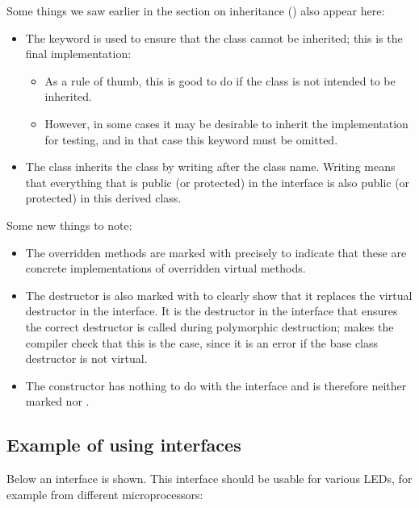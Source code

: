 \noindent Some things we saw earlier in the section on inheritance ()
also appear here:
\begin{itemize}
  \item The keyword  is used to ensure that the class 
    cannot be inherited; this is the final implementation:
  \begin{itemize}
    \item As a rule of thumb, this is good to do if the class is not intended to be inherited.
    \item However, in some cases it may be desirable to inherit the implementation for testing, and
      in that case this keyword must be omitted.
  \end{itemize}
  \item The class  inherits the class
     by writing  after the class name.
    Writing  means that everything that is public (or protected) in the interface is
    also public (or protected) in this derived class.
\end{itemize}
Some new things to note:
\begin{itemize}
  \item The overridden methods are marked with  precisely to indicate that these are
    concrete implementations of overridden virtual methods.
  \item The destructor is also marked with  to clearly show that it replaces the
    virtual destructor in the interface. It is the  destructor in the interface that
    ensures the correct destructor is called during polymorphic destruction;  makes
    the compiler check that this is the case, since it is an error if the base class destructor is
    not virtual.
  \item The constructor has nothing to do with the interface and is therefore neither marked
     nor .
\end{itemize}

\subsection{Example of using interfaces}
\label{c3:sec:usinginterfaces}
Below an interface  is shown. This interface should be usable for
various LEDs, for example from different microprocessors:

